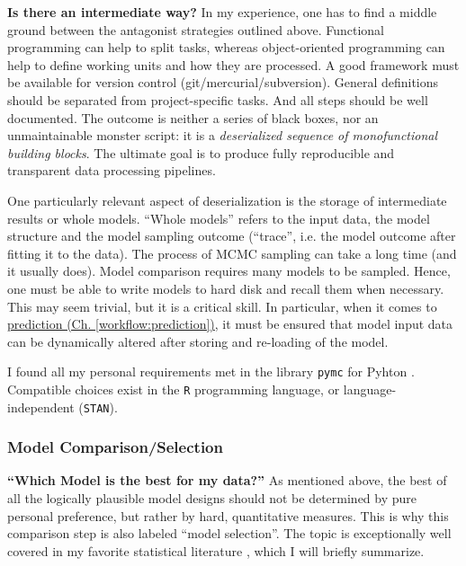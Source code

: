 \textbf{Is there an intermediate way?}
In my experience, one has to find a middle ground between the antagonist strategies outlined above.
Functional programming can help to split tasks, whereas object-oriented programming can help to define working units and how they are processed.
A good framework must be available for version control (git/mercurial/subversion).
General definitions should be separated from project-specific tasks.
And all steps should be well documented.
The outcome is neither a series of black boxes, nor an unmaintainable monster script: it is a \emph{deserialized sequence of monofunctional building blocks}.
The ultimate goal is to produce fully reproducible and transparent data processing pipelines.


One particularly relevant aspect of deserialization is the storage of intermediate results or whole models.
``Whole models'' refers to the input data, the model structure and the model sampling outcome (``trace'', i.e. the model outcome after fitting it to the data).
The process of MCMC sampling can take a long time (and it usually does).
Model comparison requires many models to be sampled.
Hence, one must be able to write models to hard disk and recall them when necessary.
This may seem trivial, but it is a critical skill.
In particular, when it comes to \hyperref[workflow:prediction]{prediction (Ch. \ref{workflow:prediction})}, it must be ensured that model input data can be dynamically altered after storing and re-loading of the model.

I found all my personal requirements met in the library \texttt{pymc} for Pyhton \citep{Salvatier2016}.
Compatible choices exist in the \texttt{R} programming language, or language-independent (\texttt{STAN}).


\subsubsection{Model Comparison/Selection}
\label{workflow:comparison}
\textbf{``Which Model is the best for my data?''}
As mentioned above, the best of all the logically plausible model designs should not be determined by pure personal preference, but rather by hard, quantitative measures.
This is why this comparison step is also labeled ``model selection''.
The topic is exceptionally well covered in my favorite statistical literature \citep[][Ch. 11]{McElreath2018}, which I will briefly summarize.

